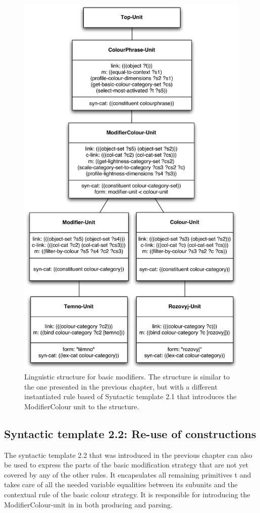 \begin{figure}[htbp]
  \centering
  \includegraphics[width=.8\textwidth]{./achromatic/figures/linguistic-structure.pdf}
  \caption[Linguistic structure for basic modifiers]{Linguistic
    structure for basic modifiers. The structure is similar to the
    one presented in the previous chapter, but with a different
    instantiated rule based of Syntactic template 2.1 that introduces
    the ModifierColour unit to the structure.}
  \label{f:ams-linguistic-structure}
\end{figure}

\subsection*{Syntactic template 2.2: Re-use of constructions}

The syntactic template 2.2 that was introduced in the previous chapter
can also be used to express the parts of the basic
  modification strategy that are not yet covered by any of the other
rules. It encapsulates all remaining primitives t and takes care of
all the needed variable equalities between its subunits and the
contextual rule of the basic colour strategy. It is responsible for
introducing the ModifierColour-unit in  in both producing and parsing.

